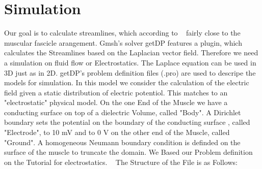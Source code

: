 \documentclass[preprint,journal]{vgtc}       %
\begin{document}
\section{Simulation}
Our goal is to calculate streamlines, which according to ~\cite{choi2013} fairly close to the muscular fascicle arangement. Gmsh's solver getDP features a plugin, which calculates the Streamlines based on the Laplacian vector field. Therefore we need a simulation on fluid flow or Electrostatics. The Laplace equation can be used in 3D just as in 2D. getDP's problem definition files (.pro) are used to descripe the models for simulation. In this model we consider the calculation of the electric field given a static distribution of electric potentiol. This matches to an "electrostatic" physical model. On the one End of the Muscle we have a conducting surface on top of a dielectric Volume, called "Body". A Dirichlet boundary sets the potential on the boundary of the conducting surface , called "Electrode", to 10 mV and to 0 V on the other end of the Muscle, called "Ground".
A homogeneous Neumann boundary condition is definded on the surface of the muscle to truncate the domain.\newline
We Based our Problem definition on the Tutorial for electrostatics. ~\cite{Geuzaine2009}
The Structure of the File is as Follows:
\end{document}
